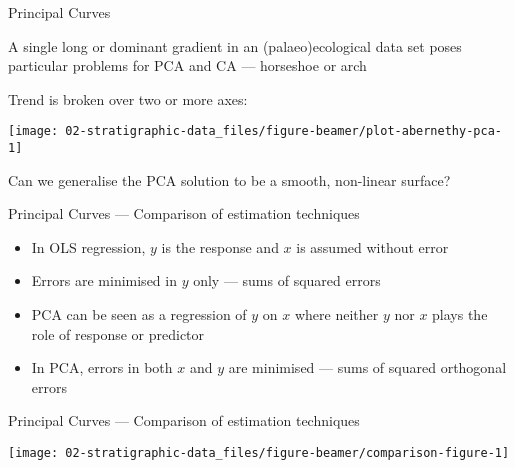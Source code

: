 \documentclass[10pt,ignorenonframetext,compress, aspectratio=169]{beamer}
\providecommand{\tightlist}{%
  \setlength{\itemsep}{0pt}\setlength{\parskip}{0pt}}
\begin{document}
\begin{frame}{Principal Curves}

A single long or dominant gradient in an (palaeo)ecological data set
poses particular problems for PCA and CA --- \alert{horseshoe} or
\alert{arch}

Trend is broken over two or more axes:

\begin{center}\texttt{[image: 02-stratigraphic-data\_files/figure-beamer/plot-abernethy-pca-1]} \end{center}

Can we generalise the PCA solution to be a smooth, non-linear surface?

\end{frame}

\begin{frame}{Principal Curves --- Comparison of estimation techniques}

\begin{itemize}
\tightlist
\item
  In OLS regression, \(y\) is the response and \(x\) is assumed without
  error
\item
  Errors are minimised in \(y\) only --- sums of squared errors
\item
  PCA can be seen as a regression of \(y\) on \(x\) where neither \(y\)
  nor \(x\) plays the role of response or predictor
\item
  In PCA, errors in both \(x\) and \(y\) are minimised --- sums of
  squared orthogonal errors
\end{itemize}

\end{frame}

\begin{frame}{Principal Curves --- Comparison of estimation techniques}

\begin{center}\texttt{[image: 02-stratigraphic-data\_files/figure-beamer/comparison-figure-1]} \end{center}

\end{frame}
\end{document}
